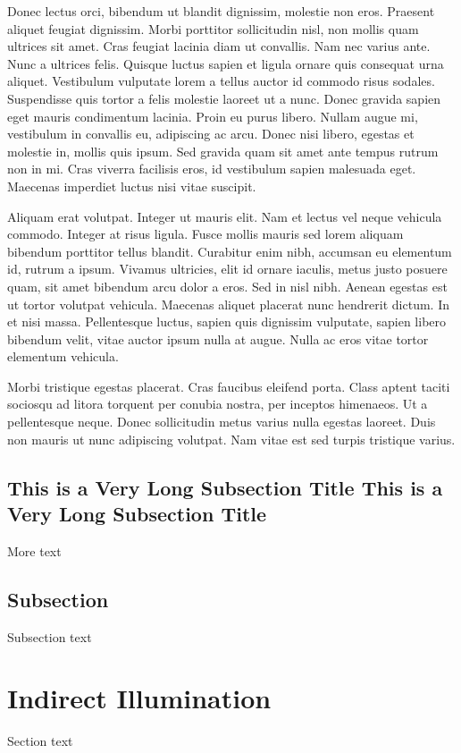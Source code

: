 Donec lectus orci, bibendum ut blandit dignissim, molestie non eros. Praesent aliquet feugiat dignissim. Morbi porttitor sollicitudin nisl, non mollis quam ultrices sit amet. Cras feugiat lacinia diam ut convallis. Nam nec varius ante. Nunc a ultrices felis. Quisque luctus sapien et ligula ornare quis consequat urna aliquet. Vestibulum vulputate lorem a tellus auctor id commodo risus sodales. Suspendisse quis tortor a felis molestie laoreet ut a nunc. Donec gravida sapien eget mauris condimentum lacinia. Proin eu purus libero. Nullam augue mi, vestibulum in convallis eu, adipiscing ac arcu. Donec nisi libero, egestas et molestie in, mollis quis ipsum. Sed gravida quam sit amet ante tempus rutrum non in mi. Cras viverra facilisis eros, id vestibulum sapien malesuada eget. Maecenas imperdiet luctus nisi vitae suscipit.



Aliquam erat volutpat. Integer ut mauris elit. Nam et lectus vel neque vehicula commodo. Integer at risus ligula. Fusce mollis mauris sed lorem aliquam bibendum porttitor tellus blandit. Curabitur enim nibh, accumsan eu elementum id, rutrum a ipsum. Vivamus ultricies, elit id ornare iaculis, metus justo posuere quam, sit amet bibendum arcu dolor a eros. Sed in nisl nibh. Aenean egestas est ut tortor volutpat vehicula. Maecenas aliquet placerat nunc hendrerit dictum. In et nisi massa. Pellentesque luctus, sapien quis dignissim vulputate, sapien libero bibendum velit, vitae auctor ipsum nulla at augue. Nulla ac eros vitae tortor elementum vehicula.

Morbi tristique egestas placerat. Cras faucibus eleifend porta. Class aptent taciti sociosqu ad litora torquent per conubia nostra, per inceptos himenaeos. Ut a pellentesque neque. Donec sollicitudin metus varius nulla egestas laoreet. Duis non mauris ut nunc adipiscing volutpat. Nam vitae est sed turpis tristique varius.

\subsection{This is a Very Long Subsection Title This is a Very Long Subsection Title}

More text
\subsection{Subsection}

Subsection text

\section{Indirect Illumination}

Section text
